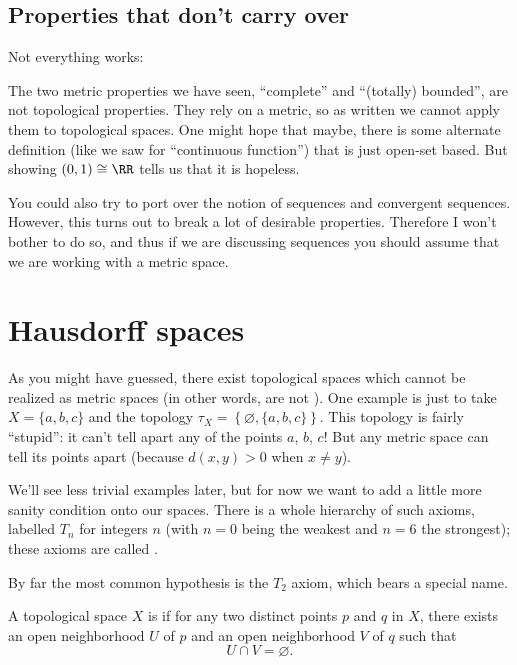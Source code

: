 \subsection{Properties that don't carry over}
Not everything works:

\begin{remark}
	The two metric properties we have seen,
	``complete'' and ``(totally) bounded'',
	are not topological properties.
	They rely on a metric,
	so as written we cannot apply them to topological spaces.
	One might hope that maybe,
	there is some alternate definition (like we saw for ``continuous function'')
	that is just open-set based.
	But  showing $(0,1) \cong \RR$
	tells us that it is hopeless.
\end{remark}

\begin{remark}
	You could also try to port over the notion
	of sequences and convergent sequences.
	However, this turns out to break a lot of desirable properties.
	Therefore I won't bother to do so,
	and thus if we are discussing sequences you should
	assume that we are working with a metric space.
\end{remark}

\section{Hausdorff spaces}

As you might have guessed,
there exist topological spaces which cannot be realized
as metric spaces (in other words, are not ).
One example is just to take $X = \{a,b,c\}$ and the topology
$\tau_X = \left\{ \varnothing, \{a,b,c\} \right\}$.
This topology is fairly ``stupid'':
it can't tell apart any of the points $a$, $b$, $c$!
But any metric space can tell its points apart (because $d(x,y) > 0$ when $x \neq y$).

We'll see less trivial examples later,
but for now we want to add a little more sanity condition onto our spaces.
There is a whole hierarchy of such axioms, labelled $T_n$ for
integers $n$ (with $n=0$ being the weakest and $n=6$ the strongest);
these axioms are called .

By far the most common hypothesis is the $T_2$ axiom,
which bears a special name.
\begin{definition}
	A topological space $X$ is  if
	for any two distinct points $p$ and $q$ in $X$,
	there exists an open neighborhood $U$ of $p$
	and an open neighborhood $V$ of $q$ such that
	\[ U \cap V = \varnothing. \]
\end{definition}

